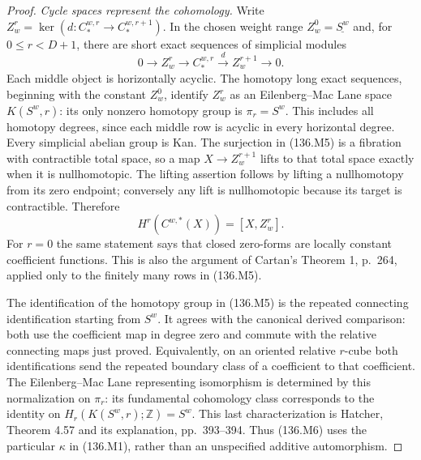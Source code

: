 \begin{proof}
\emph{Cycle spaces represent the cohomology.}
Write $Z^r_w=\ker(d:C_*^{w,r}\to C_*^{w,r+1})$.
In the chosen weight range $Z^0_w=\underline{S^w}$
and, for $0\le r<D+1$, there are short exact
sequences of simplicial modules
\[
 0\longrightarrow Z^r_w\longrightarrow C_*^{w,r}
                   \xrightarrow{d}Z^{r+1}_w\longrightarrow0.
                                                               \tag{136.M5}
\]
Each middle object is horizontally acyclic. The homotopy
long exact sequences, beginning with the constant
$Z^0_w$, identify $Z^r_w$ as an Eilenberg--Mac Lane
space $K(S^w,r)$: its only nonzero homotopy group is
$\pi_r=S^w$. This includes all homotopy degrees, since
each middle row is acyclic in every horizontal degree.
Every simplicial abelian group is Kan. The surjection
in (136.M5) is a fibration with contractible total
space, so a map $X\to Z^{r+1}_w$ lifts to that total
space exactly when it is nullhomotopic. The lifting
assertion follows by lifting a nullhomotopy from its
zero endpoint; conversely any lift is nullhomotopic
because its target is contractible. Therefore
\[
 H^r(C^{w,*}(X))=[X,Z^r_w].
                                                               \tag{136.M6}
\]
For $r=0$ the same statement says that closed
zero-forms are locally constant coefficient functions.
This is also the argument of Cartan's Theorem 1,
p.~264, applied only to the finitely many rows in
(136.M5).

The identification of the homotopy group in (136.M5)
is the repeated connecting identification starting
from $S^w$. It agrees with the canonical derived
comparison: both use the coefficient map in degree
zero and commute with the relative connecting maps
just proved. Equivalently, on an oriented relative
$r$-cube both identifications send the repeated
boundary class of a coefficient to that coefficient.
The Eilenberg--Mac Lane representing isomorphism is
determined by this normalization on $\pi_r$: its
fundamental cohomology class corresponds to the
identity on $H_r(K(S^w,r);\mathbb Z)=S^w$.
This last characterization is Hatcher, Theorem 4.57
and its explanation, pp.~393--394. Thus (136.M6)
uses the particular $\kappa$ in (136.M1), rather
than an unspecified additive automorphism.


\end{proof}
